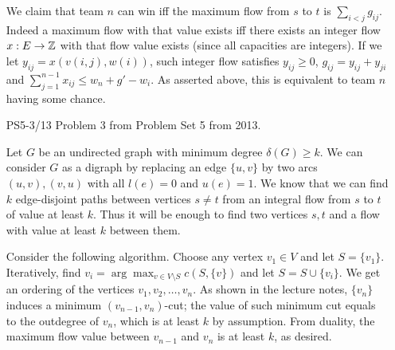 \documentclass[12pt]{article}
\begin{document}
\begin{enumerate}
We claim that team $n$ can win iff the maximum flow from $s$ to $t$ is $\sum_{i<j}{g_{ij}}$.
Indeed a maximum flow with that value exists iff there exists an integer flow $x: E \rightarrow {\mathbb Z}$
with that flow value exists (since all capacities are integers).
If we let $y_{ij} = x(v(i, j), w(i))$, such integer flow satisfies $y_{ij} \geq 0$, $g_{ij} = y_{ij} + y_{ji}$
and $\sum_{j=1}^{n-1}{x_{ij}} \leq w_n + g' - w_i$. As asserted above, this is equivalent to team $n$ having some chance.\\

\item[PS5-3/13] Problem 3 from Problem Set 5 from 2013. 

Let $G$ be an undirected graph with minimum degree $\delta(G) \geq k$.
We can consider $G$ as a digraph by replacing an edge $\{u, v\}$ by two arcs $(u, v), (v, u)$ with all $l(e) = 0$ and $u(e) = 1$.
We know that we can find $k$ edge-disjoint paths between vertices $s \neq t$ from an integral flow from $s$ to $t$ of value at least $k$.
Thus it will be enough to find two vertices $s, t$ and a flow with value at least $k$ between them.

Consider the following algorithm. Choose any vertex $v_1 \in V$ and let $S = \{v_1\}$.
Iteratively, find $v_i = \arg \max_{v\in V \setminus S}{c(S, \{v\})}$ and let $S = S\cup\{v_i\}$.
We get an ordering of the vertices $v_1, v_2, \ldots, v_n$.
As shown in the lecture notes, $\{v_n\}$ induces a minimum $(v_{n-1}, v_n)$-cut; the value
of such minimum cut equals to the outdegree of $v_n$, which is at least $k$ by assumption.
From duality, the maximum flow value between $v_{n-1}$ and $v_n$ is at least $k$, as desired.


\end{enumerate}
\end{document}

